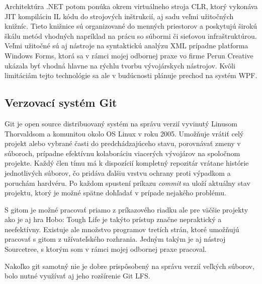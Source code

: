 \documentclass[slovak,bachelorpractice,dept460,male,csharp,cpdeclaration]{diploma}
\begin{document}
Architektúra .NET \cite{CSharpLang} potom ponúka okrem virtuálneho stroja CLR, ktorý vykonáva JIT kompiláciu IL kódu do strojových inštrukcií, aj sadu veľmi užitočných knižníc. Tieto knižnice sú organizované do menných priestorov a poskytujú širokú škálu metód vhodných napríklad na prácu so súbormi či sieťovou infraštruktúrou. Veľmi užitočné sú aj nástroje na syntaktickú analýzu XML prípadne platforma Windows Forms, ktorá sa v rámci mojej odbornej praxe vo firme Perun Creative ukázala byť vhodná hlavne na rýchlu tvorbu vývojárskych nástrojov. Kvôli limitáciám tejto technológie sa ale v budúcnosti plánuje prechod na systém WPF.
\subsection{Verzovací systém Git}
\label{sec:Git}
Git \cite{ProGit} je open source distribuovaný systém na správu verzií vyvinutý Linusom Thorvaldsom a komunitou okolo OS Linux v roku 2005. Umožňuje vrátiť celý projekt alebo vybrané časti do predchádzajúceho stavu, porovnávať zmeny v súboroch, prípadne efektívnu kolaboráciu viacerých vývojárov na spoločnom projekte. Každý člen tímu má k dispozícií kompletný repozitár vrátane histórie jednotlivých súborov, čo pridáva ďalšiu vrstvu ochrany proti výpadkom a poruchám hardvéru. Po každom spustení príkazu \textit{commit} sa uloží aktuálny stav projektu, ktorý je možné spätne dohľadať v prípade nejakého problému.

S gitom je možné pracovať priamo z príkazového riadku ale pre väčšie projekty ako je aj hra Hobo: Tough Life je takýto prístup značne nepraktický a neefektívny. Existuje ale množstvo programov tretích strán, ktoré umožňujú pracovať s gitom z užívateľského rozhrania. Jedným takým je aj nástroj Sourcetree, s ktorým som v rámci mojej odbornej praxe pracoval.

Nakoľko git samotný nie je dobre prispôsobený na správu verzií veľkých súborov, bolo nutné využívať aj jeho rozšírenie Git LFS. 
\end{document}
